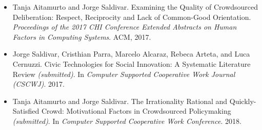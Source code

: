 \documentclass[helvetica,english,logo,notitle,totpages,utf8]{europecv2013}
\begin{document}
\begin{europecv}
{\begin{itemize}
\item Tanja Aitamurto and Jorge Saldivar. Examining the Quality of Crowdsourced Deliberation: Respect, Reciprocity and Lack of Common-Good Orientation. \textit{Proceedings of the 2017 CHI Conference Extended Abstracts on Human Factors in Computing Systems}. ACM, 2017.
\item Jorge Saldivar, Cristhian Parra, Marcelo Alcaraz, Rebeca Arteta, and Luca Cernuzzi. Civic Technologies for Social Innovation: A Systematic Literature Review \textit{(submitted)}. In \textit{Computer Supported Cooperative Work Journal (CSCWJ)}. 2017.
\item Tanja Aitamurto and Jorge Saldivar. The Irrationality Rational and Quickly-Satisfied Crowd: Motivational Factors in Crowdsourced Policymaking \textit{(submitted)}. In \textit{Computer Supported Cooperative Work Conference}. 2018.
\end{itemize}
}




\end{europecv}
\end{document}
